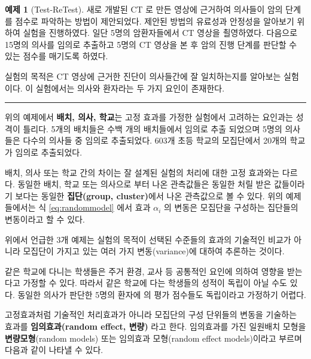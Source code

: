 \documentclass[
]{book}
\makeatletter
\newenvironment{kframe}{%
\medskip{}
\setlength{\fboxsep}{.8em}
 \def\at@end@of@kframe{}%
 \ifinner\ifhmode%
  \def\at@end@of@kframe{\end{minipage}}%
  \begin{minipage}{\columnwidth}%
 \fi\fi%
 \def\FrameCommand##1{\hskip\@totalleftmargin \hskip-\fboxsep
 \colorbox{shadecolor}{##1}\hskip-\fboxsep
     \hskip-\linewidth \hskip-\@totalleftmargin \hskip\columnwidth}%
 \MakeFramed {\advance\hsize-\width
   \@totalleftmargin\z@ \linewidth\hsize
   \@setminipage}}%
 {\par\unskip\endMakeFramed%
 \at@end@of@kframe}
\newenvironment{rmdblock}[1]
  {
  \begin{itemize}
  \renewcommand{\labelitemi}{
    \raisebox{-.7\height}[0pt][0pt]{
      {\setkeys{Gin}{width=3em,keepaspectratio}\texttt{[image: images/\#1]}}
    }
  }
  \setlength{\fboxsep}{1em}
  \begin{kframe}
  \item
  }
  {
  \end{kframe}
  \end{itemize}
  }
\newenvironment{rmdnote}
  {\begin{rmdblock}{note}}
  {\end{rmdblock}}
\theoremstyle{definition}
\theoremstyle{definition}
\newtheorem{example}{예제}[chapter]
\theoremstyle{definition}
\theoremstyle{remark}
\makeatother
\begin{document}
\begin{example}[Test-ReTest]
\protect\hypertarget{exm:unnamed-chunk-4}{}{\label{exm:unnamed-chunk-4} {} }새로 개발된 CT 로 만든 영상에 근거하여 의사들이 암의 단계를 점수로 파악하는 방법이 제안되었다. 제안된 방법의 유료성과 안정성을 알아보기 위하여 실험을 진행하였다. 일단 5명의 암환자들에서 CT 영상을 쵤영하였다. 다음으로 15명의 의사를 임의로 추출하고 5명의 CT 영상을 본 후 암의 진행 단계를 판단할 수 있는 점수를 매기도록 하였다.

실험의 목적은 CT 영상에 근거한 진단이 의사들간에 잘 일치하는지를 알아보는 실험이다. 이 실험에서는 의사와 환자라는 두 가지 요인이 존재한다.\\
\end{example}

\begin{center}\rule{0.5\linewidth}{0.5pt}\end{center}

위의 예제에서 \textbf{배치, 의사, 학교}는 고정 효과를 가정한 실험에서 고려하는 요인과는 성격이 틀리다. 5개의 배치들은 수백 개의 배치들에서 임의로 추출 되었으며 5명의 의사들은 다수의 의사들 중 임의로 추출되었다. 603개 초등 학교의 모집단에서 20개의 학교가 임의로 추출되었다.

배치, 의사 또는 학교 간의 차이는 잘 설계된 실험의 처리에 대한 고정 효과와는 다르다. 동일한 배치, 학교 또는 의사으로 부터 나온 관측값들은 동일한 처릴 받은 값들이라기 보다는 동일한 \textbf{집단(group, cluster)}에서 나온 관측값으로 볼 수 있다. 위의 예제들에서는 식 \eqref{eq:randommodel} 에서 효과 \(\alpha_i\) 의 변동은 모집단을 구성하는 집단들의 변동이라고 할 수 있다.

위에서 언급한 3개 예제는 실험의 목적이 선택된 수준들의 효과의 기술적인 비교가 아니라 모집단이 가지고 있는 여러 가지 변동(variance)에 대하여 추론하는 것이다.

\begin{rmdnote}
같은 학교에 다니는 학생들은 주거 환경, 교사 등 공통적인 요인에 의하여 영향을 받는다고 가정할 수 있다. 따라서 같은 학교에 다는 학생들의 성적이 독립이 아닐 수도 있다. 동일한 의사가 판단한 5명의 환자에 의 평가 점수들도 독립이라고 가정하기 어렵다.\\
\end{rmdnote}

고정효과처럼 기술적인 처리효과가 아니라 모집단의 구성 단위들의 변동을 기술하는 효과를 \textbf{임의효과(random effect, 변량)} 라고 한다. 임의효과를 가진 일원배치 모형을 \textbf{변량모형}(random models) 또는 임의효과 모형(random effect models)이라고 부르며 다음과 같이 나타낼 수 있다.
\end{document}
